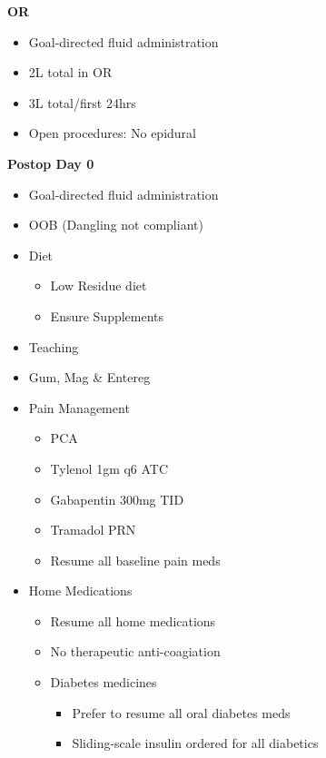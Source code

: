 \documentclass[
]{book}
\providecommand{\tightlist}{%
  \setlength{\itemsep}{0pt}\setlength{\parskip}{0pt}}
\begin{document}
\textbf{OR}

\begin{itemize}
\tightlist
\item
  Goal-directed fluid administration
\item
  2L total in OR
\item
  3L total/first 24hrs
\item
  Open procedures: No epidural
\end{itemize}

\textbf{Postop Day 0}

\begin{itemize}
\tightlist
\item
  Goal-directed fluid administration
\item
  OOB (Dangling not compliant)
\item
  Diet

  \begin{itemize}
  \tightlist
  \item
    Low Residue diet
  \item
    Ensure Supplements
  \end{itemize}
\item
  Teaching
\item
  Gum, Mag \& Entereg
\item
  Pain Management

  \begin{itemize}
  \tightlist
  \item
    PCA
  \item
    Tylenol 1gm q6 ATC
  \item
    Gabapentin 300mg TID
  \item
    Tramadol PRN
  \item
    Resume all baseline pain meds
  \end{itemize}
\item
  Home Medications

  \begin{itemize}
  \tightlist
  \item
    Resume all home medications
  \item
    No therapeutic anti-coagiation
  \item
    Diabetes medicines

    \begin{itemize}
    \tightlist
    \item
      Prefer to resume all oral diabetes meds
    \item
      Sliding-scale insulin ordered for all diabetics
    \end{itemize}
  \end{itemize}
\end{itemize}
\end{document}
